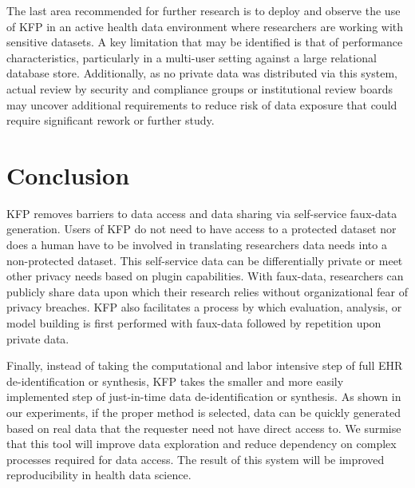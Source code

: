 \documentclass{amia}
\begin{document}
The last area recommended for further research is to deploy and observe the use of KFP in an active health data environment where researchers are working with sensitive datasets. A key limitation that may be identified is that of performance characteristics, particularly in a multi-user setting against a large relational database store. Additionally, as no private data was distributed via this system, actual review by security and compliance groups or institutional review boards may uncover additional requirements to reduce risk of data exposure that could require significant rework or further study.

\section{Conclusion}

KFP removes barriers to data access and data sharing via self-service faux-data generation. Users of KFP do not need to have access to a protected dataset nor does a human have to be involved in translating researchers data needs into a non-protected dataset. This self-service data can be differentially private or meet other privacy needs based on plugin capabilities. With faux-data, researchers can publicly share data upon which their research relies without organizational fear of privacy breaches. KFP also facilitates a process by which evaluation, analysis, or model building is first performed with faux-data followed by repetition upon private data. 

Finally, instead of taking the computational and labor intensive step of full EHR de-identification or synthesis, KFP takes the smaller and more easily implemented step of just-in-time data de-identification or synthesis. As shown in our experiments, if the proper method is selected, data can be quickly generated based on real data that the requester need not have direct access to. We surmise that this tool will improve data exploration and reduce dependency on complex processes required for data access. The result of this system will be improved reproducibility in health data science.




\end{document}
